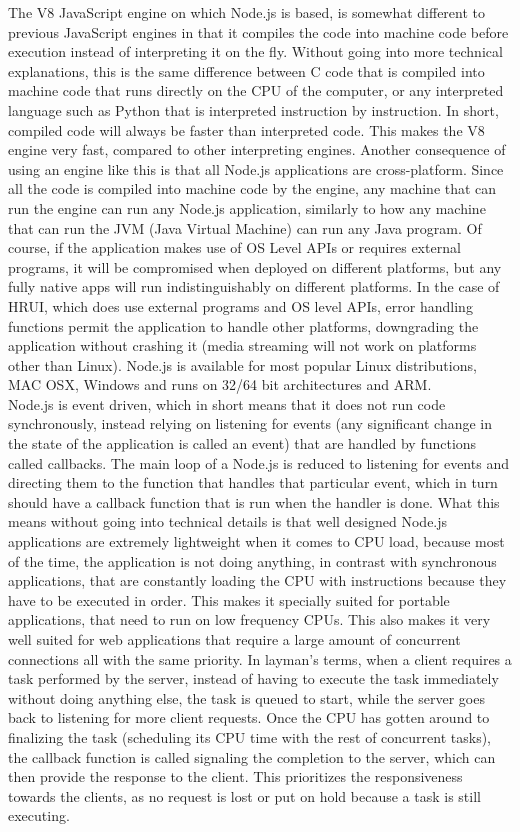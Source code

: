 The V8 JavaScript engine on which Node.js is based, is somewhat different to previous JavaScript engines in that it compiles
the code into machine code before execution instead of interpreting it on the fly. Without going into more technical
explanations, this is the same difference between C code that is compiled into machine code that runs directly on the CPU of
the computer, or any interpreted language such as Python that is interpreted instruction by instruction. In short, compiled
code will always be faster than interpreted code. This makes the V8 engine very fast, compared to other interpreting engines.
Another consequence of using an engine like this is that all Node.js applications are cross-platform. Since all the code is
compiled into machine code by the engine, any machine that can run the engine can run any Node.js application, similarly to
how any machine that can run the JVM (Java Virtual Machine) can run any Java program. Of course, if the application makes use
of OS Level APIs or requires external programs, it will be compromised when deployed on different platforms, but any fully
native apps will run indistinguishably on different platforms. In the case of HRUI, which does use external programs and OS
level APIs, error handling functions permit the application to handle other platforms, downgrading the application without
crashing it (media streaming will not work on platforms other than Linux). Node.js is available for most popular Linux
distributions, MAC OSX, Windows and runs on 32/64 bit architectures and ARM.\\

Node.js is event driven, which in short means that it does not run code synchronously, instead relying on listening for events
(any significant change in the state of the application is called an event) that are handled by functions called callbacks.
The main loop of a Node.js is reduced to listening for events and directing them to the function that handles that particular
event, which in turn should have a callback function that is run when the handler is done. What this means without going into
technical details is that well designed Node.js applications are extremely lightweight when it comes to CPU load, because most
of the time, the application is not doing anything, in contrast with synchronous applications, that are constantly loading the
CPU with instructions because they have to be executed in order. This makes it specially suited for portable applications,
that need to run on low frequency CPUs. This also makes it very well suited for web applications that require a large amount
of concurrent connections all with the same priority. In layman's terms, when a client requires a task performed by the
server, instead of having to execute the task immediately without doing anything else, the task is queued to start, while the
server goes back to listening for more client requests. Once the CPU has gotten around to finalizing the task (scheduling its
CPU time with the rest of concurrent tasks), the callback function is called signaling the completion to the server, which can
then provide the response to the client. This prioritizes the responsiveness towards the clients, as no request is lost or put
on hold because a task is still executing.\\

